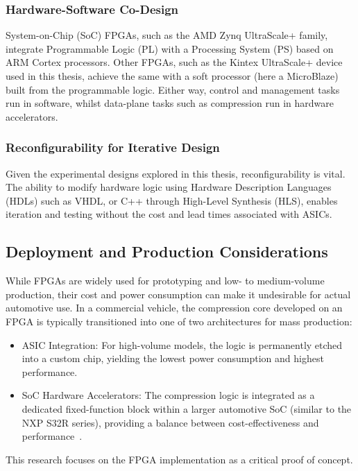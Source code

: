 \subsubsection{Hardware-Software Co-Design}
System-on-Chip (SoC) FPGAs, such as the AMD Zynq UltraScale+ family, integrate Programmable Logic (PL) with a Processing System (PS) based on ARM Cortex processors. Other FPGAs, such as the Kintex UltraScale+ device used in this thesis, achieve the same with a soft processor (here a MicroBlaze) built from the programmable logic. Either way, control and management tasks run in software, whilst data-plane tasks such as compression run in hardware accelerators.

\subsubsection{Reconfigurability for Iterative Design}
Given the experimental designs explored in this thesis, reconfigurability is vital. The ability to modify hardware logic using Hardware Description Languages (HDLs) such as VHDL, or C++ through High-Level Synthesis (HLS), enables iteration and testing without the cost and lead times associated with ASICs.

\subsection{Deployment and Production Considerations}

While FPGAs are widely used for prototyping and low- to medium-volume production, their cost and power consumption can make it undesirable for actual automotive use. In a commercial vehicle, the compression core developed on an FPGA is typically transitioned into one of two architectures for mass production:

\begin{itemize}
    \item ASIC Integration: For high-volume models, the logic is permanently etched into a custom chip, yielding the lowest power consumption and highest performance.
    \item SoC Hardware Accelerators: The compression logic is integrated as a dedicated fixed-function block within a larger automotive SoC (similar to the NXP S32R series), providing a balance between cost-effectiveness and performance~\cite{nxp_an5375}.
\end{itemize}

This research focuses on the FPGA implementation as a critical proof of concept.

